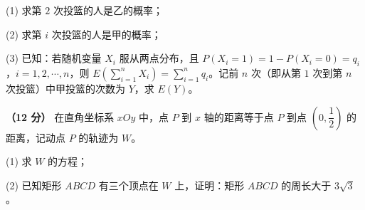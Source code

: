   (1) 求第 $2$ 次投篮的人是乙的概率；

  (2) 求第 $i$ 次投篮的人是甲的概率；

  (3) 已知：若随机变量 $X_i$ 服从两点分布，且 $P\left(X_i=1\right)=1-P\left(X_i=0\right)=q_i$，$i=1,2,\cdots,n$，则 $E\left(\displaystyle\sum_{i=1}^{n}X_i\right)=\displaystyle\sum_{i=1}^{n}q_i$。记前 $n$ 次（即从第 $1$ 次到第 $n$ 次投篮）中甲投篮的次数为 $Y$，求 $E(Y)$。

\textbf{（12 分）} 在直角坐标系 $xOy$ 中，点 $P$ 到 $x$ 轴的距离等于点 $P$ 到点 $\left(0,\dfrac12\right)$ 的距离，记动点 $P$ 的轨迹为 $W$。

  (1) 求 $W$ 的方程；

  (2) 已知矩形 $ABCD$ 有三个顶点在 $W$ 上，证明：矩形 $ABCD$ 的周长大于 $3\sqrt3$。

\par\medskip

